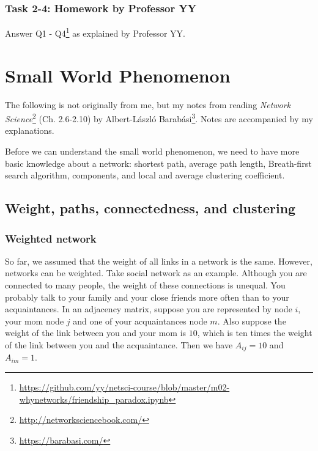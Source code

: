 \documentclass[
]{krantz}
\makeatletter
\renewcommand{\href}[2]{#2\footnote{\url{#1}}}
\newenvironment{kframe}{%
\medskip{}
\setlength{\fboxsep}{.8em}
 \def\at@end@of@kframe{}%
 \ifinner\ifhmode%
  \def\at@end@of@kframe{\end{minipage}}%
  \begin{minipage}{\columnwidth}%
 \fi\fi%
 \def\FrameCommand##1{\hskip\@totalleftmargin \hskip-\fboxsep
 \colorbox{shadecolor}{##1}\hskip-\fboxsep
     \hskip-\linewidth \hskip-\@totalleftmargin \hskip\columnwidth}%
 \MakeFramed {\advance\hsize-\width
   \@totalleftmargin\z@ \linewidth\hsize
   \@setminipage}}%
 {\par\unskip\endMakeFramed%
 \at@end@of@kframe}
\newenvironment{rmdblock}[1]
  {
  \begin{itemize}
  \renewcommand{\labelitemi}{
    \raisebox{-.7\height}[0pt][0pt]{
      {\setkeys{Gin}{width=3em,keepaspectratio}\texttt{[image: images/\#1]}}
    }
  }
  \setlength{\fboxsep}{1em}
  \begin{kframe}
  \item
  }
  {
  \end{kframe}
  \end{itemize}
  }
\newenvironment{rmdnote}
  {\begin{rmdblock}{note}}
  {\end{rmdblock}}
\makeatother
\begin{document}
\hypertarget{task-2-4-homework-by-professor-yy}{%
\subsection{Task 2-4: Homework by Professor YY}\label{task-2-4-homework-by-professor-yy}}

Answer \href{https://github.com/yy/netsci-course/blob/master/m02-whynetworks/friendship_paradox.ipynb}{Q1 - Q4} as explained by Professor YY.

\hypertarget{SmallWorld}{%
\chapter{Small World Phenomenon}\label{SmallWorld}}

\begin{rmdnote}
The following is not originally from me, but my notes from reading \href{http://networksciencebook.com/}{\emph{Network Science}} (Ch. 2.6-2.10) by \href{https://barabasi.com/}{Albert-László Barabási}. Notes are accompanied by my explanations.
\end{rmdnote}

Before we can understand the small world phenomenon, we need to have more basic knowledge about a network: shortest path, average path length, Breath-first search algorithm, components, and local and average clustering coefficient.

\hypertarget{weight-paths-connectedness-and-clustering}{%
\section{Weight, paths, connectedness, and clustering}\label{weight-paths-connectedness-and-clustering}}

\hypertarget{weighted-network}{%
\subsection{Weighted network}\label{weighted-network}}

So far, we assumed that the weight of all links in a network is the same. However, networks can be weighted. Take social network as an example. Although you are connected to many people, the weight of these connections is unequal. You probably talk to your family and your close friends more often than to your acquaintances. In an adjacency matrix, suppose you are represented by node \(i\), your mom node \(j\) and one of your acquaintances node \(m\). Also suppose the weight of the link between you and your mom is \(10\), which is ten times the weight of the link between you and the acquaintance. Then we have \(A_{ij} = 10\) and \(A_{im} = 1\).
\end{document}
